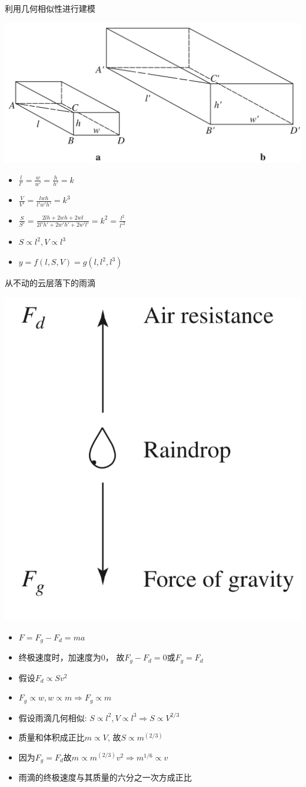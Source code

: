 \documentclass[UTF8, mathserif]{ctexbeamer}
\begin{document}
\begin{frame}{利用几何相似性进行建模}
  \begin{center}
    \includegraphics[width=.4\textwidth{}]{similar.png}
  \end{center}
  \begin{itemize}
  \item $\frac{l}{l'} = \frac{w}{w'} = \frac{h}{h'} = k$
  \item $\frac{V}{V'} = \frac{lwh}{l'w'h'} = k^3$
  \item $\frac{S}{S'} = \frac{2lh+2wh+2wl}{2l'h'+2w'h'+2w'l'} = k^2 = \frac{l^2}{l'^2}$
  \item $S \propto l^2, V \propto l^3$
  \item $y = f(l, S, V) = g(l, l^2, l^3)$
  \end{itemize}

\end{frame}

\begin{frame}{从不动的云层落下的雨滴}

  \begin{center}
    \includegraphics[width=.15\textwidth{}]{rain.png}
  \end{center}

  \begin{itemize}
  \item $F = F_g - F_d = ma$
  \item 终极速度时，加速度为0， 故$F_g - F_d = 0$或$F_g = F_d$
  \item 假设$F_d \propto Sv^2$
  \item $F_g \propto w, w \propto m \Rightarrow F_g \propto m$
  \item 假设雨滴几何相似: $S \propto l^2, V \propto l^3 \Rightarrow S \propto V^{2/3}$
  \item 质量和体积成正比$m \propto V$, 故$S \propto m^(2/3)$
  \item 因为$F_g = F_d$故$m \propto m^(2/3)v^2 \Rightarrow m^{1/6} \propto v$
  \item 雨滴的终极速度与其质量的六分之一次方成正比
  \end{itemize}
\end{frame}
\end{document}
